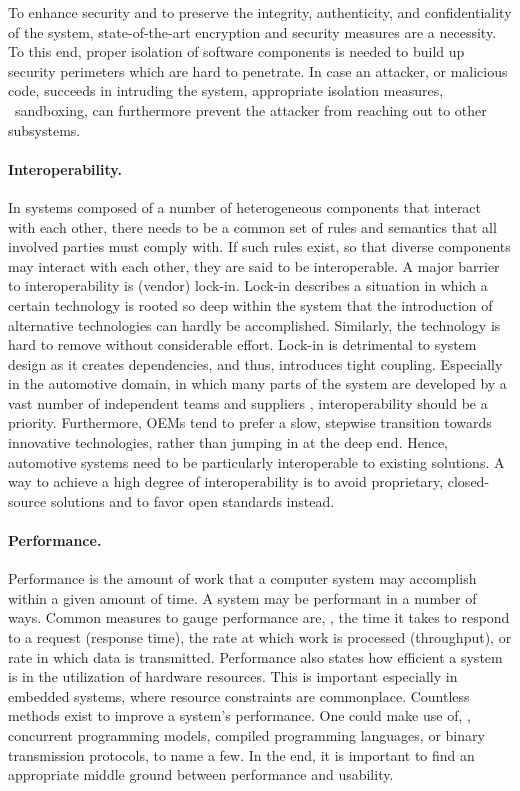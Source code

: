 To enhance security and to preserve the integrity, authenticity, and confidentiality of the system, state-of-the-art encryption and security measures are a necessity. To this end, proper isolation of software components is needed to build up security perimeters which are hard to penetrate. In case an attacker, or malicious code, succeeds in intruding the system, appropriate isolation measures, \ie\ sandboxing, can furthermore prevent the attacker from reaching out to other subsystems.

\paragraph{Interoperability.}
In systems composed of a number of heterogeneous components that interact with each other, there needs to be a common set of rules and semantics that all involved parties must comply with. If such rules exist, so that diverse components may interact with each other, they are said to be interoperable.
A major barrier to interoperability is (vendor) lock-in. Lock-in describes a situation in which a certain technology is rooted so deep within the system that the introduction of alternative technologies can hardly be accomplished. Similarly, the technology is hard to remove without considerable effort. Lock-in is detrimental to system design as it creates dependencies, and thus, introduces tight coupling. Especially in the automotive domain, in which many parts of the system are developed by a vast number of independent teams and suppliers \cite{broy2006challenges}, interoperability should be a priority. Furthermore, OEMs tend to prefer a slow, stepwise transition towards innovative technologies, rather than jumping in at the deep end. Hence, automotive systems need to be particularly interoperable to existing solutions. A way to achieve a high degree of interoperability is to avoid proprietary, closed-source solutions and to favor open standards instead.

\paragraph{Performance.}
Performance is the amount of work that a computer system may accomplish within a given amount of time. A system may be performant in a number of ways. Common measures to gauge performance are, \eg , the time it takes to respond to a request (response time), the rate at which work is processed (throughput), or rate in which data is transmitted. Performance also states how efficient a system is in the utilization of hardware resources. This is important especially in embedded systems, where resource constraints are commonplace. Countless methods exist to improve a system's performance. One could make use of, \eg , concurrent programming models, compiled programming languages, or binary transmission protocols, to name a few. In the end, it is important to find an appropriate middle ground between performance and usability.

